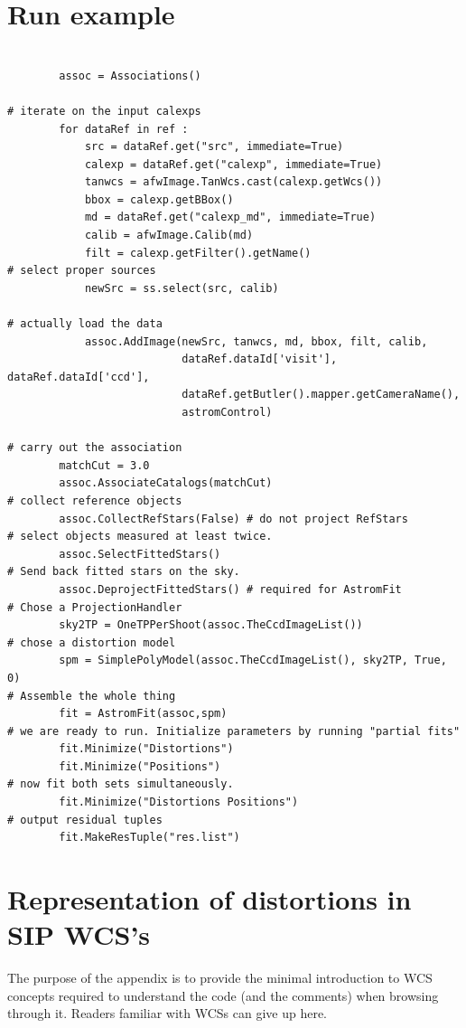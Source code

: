 \documentclass[a4paper,12pt]{scrartcl}
\begin{document}
\section{Run example}
\begin{verbatim}

        assoc = Associations()

# iterate on the input calexps        
        for dataRef in ref :
            src = dataRef.get("src", immediate=True)
            calexp = dataRef.get("calexp", immediate=True)
            tanwcs = afwImage.TanWcs.cast(calexp.getWcs())
            bbox = calexp.getBBox()
            md = dataRef.get("calexp_md", immediate=True)
            calib = afwImage.Calib(md)
            filt = calexp.getFilter().getName()
# select proper sources            
            newSrc = ss.select(src, calib)

# actually load the data            
            assoc.AddImage(newSrc, tanwcs, md, bbox, filt, calib,
                           dataRef.dataId['visit'], dataRef.dataId['ccd'],
                           dataRef.getButler().mapper.getCameraName(), 
                           astromControl)

# carry out the association        
        matchCut = 3.0
        assoc.AssociateCatalogs(matchCut)
# collect reference objects
        assoc.CollectRefStars(False) # do not project RefStars
# select objects measured at least twice.
        assoc.SelectFittedStars()
# Send back fitted stars on the sky.
        assoc.DeprojectFittedStars() # required for AstromFit
# Chose a ProjectionHandler
        sky2TP = OneTPPerShoot(assoc.TheCcdImageList())
# chose a distortion model
        spm = SimplePolyModel(assoc.TheCcdImageList(), sky2TP, True, 0)
# Assemble the whole thing
        fit = AstromFit(assoc,spm)
# we are ready to run. Initialize parameters by running "partial fits"
        fit.Minimize("Distortions")
        fit.Minimize("Positions")
# now fit both sets simultaneously.
        fit.Minimize("Distortions Positions")
# output residual tuples
        fit.MakeResTuple("res.list")
\end{verbatim}
  




\appendix
\section{Representation of distortions in SIP WCS's \label{sec:sip-wcs}}
The purpose of the appendix is to provide the minimal introduction
to WCS concepts required to understand the code (and the comments)
when browsing through it. Readers familiar with WCSs can give up here.
\end{document}
